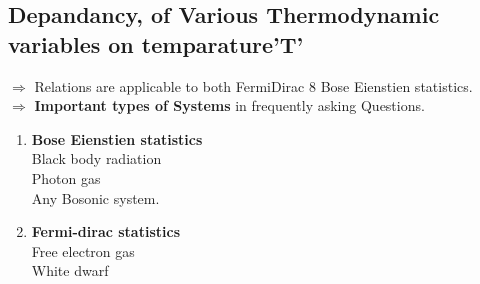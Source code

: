 \subsection	{Depandancy, of Various Thermodynamic variables on temparature'T'}
$\Rightarrow$ Relations are applicable to both FermiDirac 8 Bose Eienstien statistics.\\
$\Rightarrow$\textbf{ Important types of Systems }in frequently asking Questions.\\
\begin{enumerate}
	\item \textbf{Bose Eienstien statistics}\\
	Black body radiation\\
	Photon gas\\
	Any Bosonic system.\\
	\item\textbf{ Fermi-dirac statistics}\\
	Free electron gas\\
	White dwarf
\end{enumerate}

